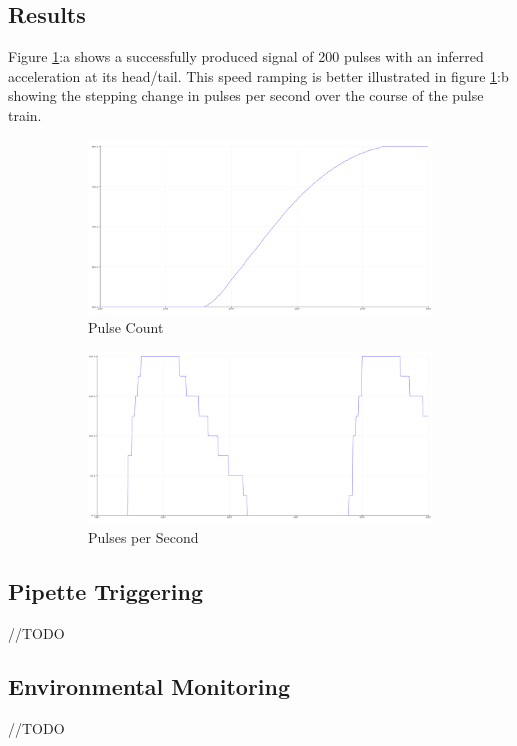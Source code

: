 \subsection{Results}

Figure \ref{fig:code}:a shows a successfully produced signal of 200 pulses with an inferred acceleration at its head/tail. This speed ramping is better illustrated in figure \ref{fig:code}:b showing the stepping change in pulses per second over the course of the pulse train.

\begin{figure}[h]
    \centering
    \begin{subfigure}{.45\textwidth}
        \centering
        \includegraphics[width=0.8\linewidth]{img/stepper_pulses.PNG}
        \caption{Pulse Count}
    \end{subfigure}%
    \begin{subfigure}{.45\textwidth}
        \centering
        \includegraphics[width=0.8\linewidth]{img/stepper_pulse_acc.PNG}
        \caption{Pulses per Second}
    \end{subfigure}
    \caption{}
    \label{fig:code}
\end{figure}

\subsection{Pipette Triggering}
//TODO
\subsection{Environmental Monitoring}
//TODO